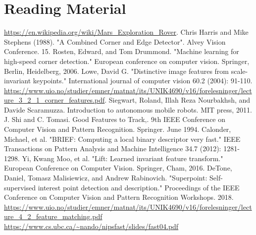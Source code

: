 \documentclass[aspectratio=169, compress]{beamer}
\begin{document}
	\section{Reading Material}
	\begin{thebibliography}{00}
	 \url{https://en.wikipedia.org/wiki/Mars_Exploration_Rover}.
	  Chris Harris and Mike Stephens (1988). "A Combined Corner and Edge Detector". Alvey Vision Conference. 15.
	 Rosten, Edward, and Tom Drummond. "Machine learning for high-speed corner detection." European conference on computer vision. Springer, Berlin, Heidelberg, 2006.
	 Lowe, David G. "Distinctive image features from scale-invariant keypoints." International journal of computer vision 60.2 (2004): 91-110.
	 \url{https://www.uio.no/studier/emner/matnat/its/UNIK4690/v16/forelesninger/lecture_3_2_1_corner_features.pdf}.
	 Siegwart, Roland, Illah Reza Nourbakhsh, and Davide Scaramuzza. Introduction to autonomous mobile robots. MIT press, 2011.
	 J. Shi and C. Tomasi. Good Features to Track,. 9th IEEE Conference on Computer Vision and Pattern Recognition. Springer. June 1994. 
	 Calonder, Michael, et al. "BRIEF: Computing a local binary descriptor very fast." IEEE Transactions on Pattern Analysis and Machine Intelligence 34.7 (2012): 1281-1298.
	 Yi, Kwang Moo, et al. "Lift: Learned invariant feature transform." European Conference on Computer Vision. Springer, Cham, 2016.
	 DeTone, Daniel, Tomasz Malisiewicz, and Andrew Rabinovich. "Superpoint: Self-supervised interest point detection and description." Proceedings of the IEEE Conference on Computer Vision and Pattern Recognition Workshops. 2018.
	 \url{ https://www.uio.no/studier/emner/matnat/its/UNIK4690/v16/forelesninger/lecture_4_2_feature_matching.pdf}
	 \url{https://www.cs.ubc.ca/~nando/nipsfast/slides/fast04.pdf}
	\end{thebibliography}	
	
\end{document}
